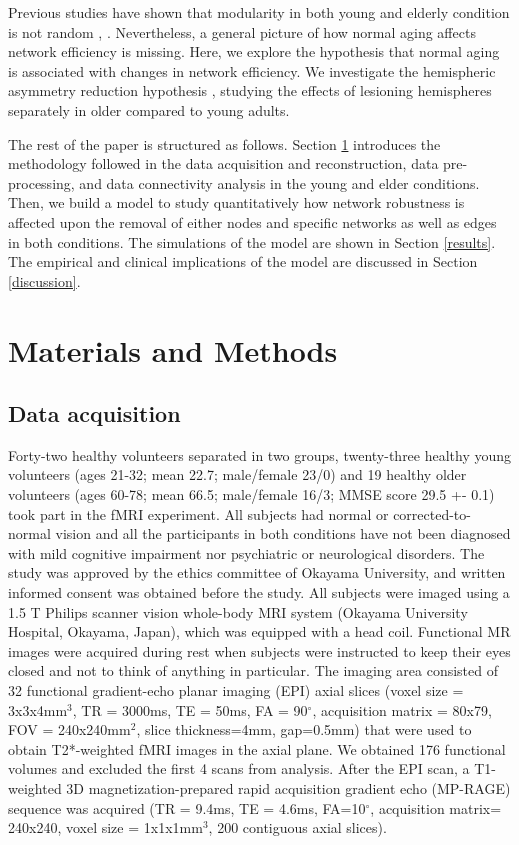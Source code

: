 \documentclass[12pt,a4paper]{article}
\begin{document}
Previous studies have shown that modularity in both young and elderly condition is not random \cite{meunier_age-related_2009}, \cite{song_age-related_2014}. Nevertheless, a general picture of how normal aging affects network efficiency is missing. Here, we explore the hypothesis that normal aging  is associated with changes in network efficiency. 
We investigate the hemispheric asymmetry reduction hypothesis \cite{cabeza_aging_2002}, studying the effects of lesioning hemispheres separately in older compared to young adults.  

The rest of the paper is structured as follows. Section \ref{mat-methods} introduces the 
methodology followed in the data acquisition and reconstruction, data
pre-processing, and data connectivity analysis in the young and elder conditions. Then, we build a model to study quantitatively how network robustness is affected upon the removal of either nodes and specific networks as well as edges in both conditions. The simulations of the model are shown in Section \ref{results}. The empirical and clinical implications of the model are discussed in Section \ref{discussion}. 

\section{Materials and Methods}
\label{mat-methods}

\subsection{Data acquisition}

Forty-two healthy volunteers separated in two groups, twenty-three healthy young volunteers (ages 21-32; mean 22.7; male/female 23/0) and 19 healthy older volunteers (ages 60-78; mean 66.5; male/female 16/3; MMSE score 29.5 +- 0.1) took part in the fMRI experiment. All subjects had
normal or corrected-to-normal vision and all the participants in both conditions have not been diagnosed with mild cognitive impairment nor psychiatric or neurological disorders. 
The study was approved by the ethics
committee of Okayama University, and written informed consent was obtained before the study. All subjects were imaged using a 1.5 T Philips scanner vision whole-body MRI system (Okayama University Hospital, Okayama, Japan), which was equipped with a head coil. Functional MR images were acquired during rest when subjects were
 instructed to keep their eyes closed and not to think of anything in
 particular. The imaging area consisted of 32 functional gradient-echo planar
 imaging (EPI) axial slices (voxel size = 3x3x4mm$^3$, TR = 3000ms, TE = 50ms,
 FA = 90$^\circ$, acquisition matrix = 80x79, FOV = 240x240mm$^2$, slice thickness=4mm, gap=0.5mm) that were used to obtain T2*-weighted fMRI images in the
 axial plane. We obtained 176 functional volumes and excluded the first 4 scans
 from analysis. After the EPI scan, a T1-weighted 3D magnetization-prepared
 rapid acquisition gradient echo (MP-RAGE) sequence was acquired (TR = 9.4ms, TE = 4.6ms, FA=10$^\circ$, acquisition matrix= 240x240, voxel size = 1x1x1mm$^3$, 200 contiguous axial slices).
\end{document}
